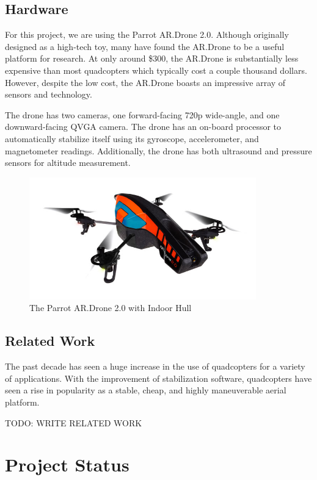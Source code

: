 \documentclass[pageno]{jpaper}
\begin{document}
\subsection{Hardware}
For this project, we are using the Parrot AR.Drone 2.0. Although originally designed as a high-tech toy, many have found the AR.Drone to be a useful platform for research. At only around \$300, the AR.Drone is substantially less expensive than most quadcopters which typically cost a couple thousand dollars. However, despite the low cost, the AR.Drone boasts an impressive array of sensors and technology.

The drone has two cameras, one forward-facing 720p wide-angle, and one downward-facing QVGA camera. The drone has an on-board processor to automatically stabilize itself using its gyroscope, accelerometer, and magnetometer readings. Additionally, the drone has both ultrasound and pressure sensors for altitude measurement.

\begin{figure}
\centering
\includegraphics[height=200px]{../images/drone_in.jpg}
\caption{The Parrot AR.Drone 2.0 with Indoor Hull}
\end{figure}

\subsection{Related Work}

The past decade has seen a huge increase in the use of quadcopters for a variety of applications. With the improvement of stabilization software, quadcopters have seen a rise in popularity as a stable, cheap, and highly maneuverable aerial platform. 

TODO: WRITE RELATED WORK


\section{Project Status}
\end{document}
